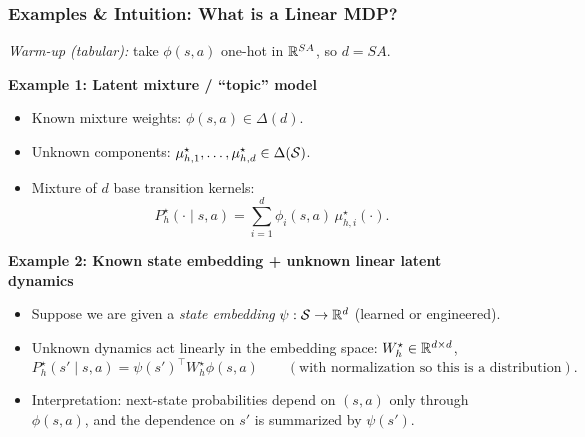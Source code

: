 \documentclass[aspectratio=169]{beamer}
\begin{document}
\begin{frame}\frametitle{Examples \& Intuition: What is a Linear MDP?}

\small
\textit{Warm-up (tabular):} take $\phi(s,a)$ one-hot in $\mathbb{R}^{SA}$, so $d=SA$.

\vspace{0.25cm}
\pause
\textbf{Example 1: Latent mixture / ``topic'' model}
\begin{itemize}
  \item Known mixture weights: $\phi(s,a)\in\Delta(d)$.
  \item Unknown components: $\mu_{h,1}^\star,\dots,\mu_{h,d}^\star\in\Delta(\mathcal{S})$.
  \item Mixture of $d$ base transition kernels:
  \[
  P_h^\star(\cdot\mid s,a)=\sum_{i=1}^d \phi_i(s,a)\,\mu_{h,i}^\star(\cdot).
  \]
\end{itemize}

\vspace{0.10cm}
\pause
\textbf{Example 2: Known state embedding + unknown linear latent dynamics}
\begin{itemize}
  \item Suppose we are given a \emph{state embedding} $\psi:\mathcal{S}\to\mathbb{R}^d$ (learned or engineered).
  \item Unknown dynamics act linearly in the embedding space: $W_h^\star\in\mathbb{R}^{d\times d}$,
  \[
  P_h^\star(s'\mid s,a)=\psi(s')^\top W_h^\star \phi(s,a)
  \qquad (\text{with normalization so this is a distribution}).
  \]
  \item Interpretation: next-state probabilities depend on $(s,a)$ only through $\phi(s,a)$,
  and the dependence on $s'$ is summarized by $\psi(s')$.
\end{itemize}

\end{frame}
\end{document}
